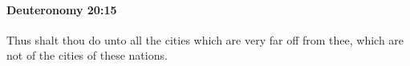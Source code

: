 
		\paragraph{Deuteronomy 20:15} %
			\label{DEUTERONOMY-20-15}

			Thus shalt thou do unto all the cities which are very far off from thee, which are not of the cities of these nations.


